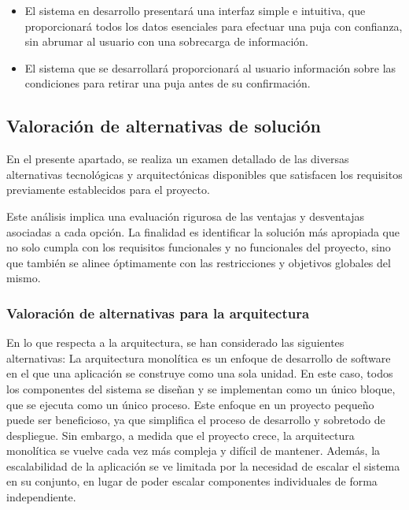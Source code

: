 \begin{itemize}
    \item El sistema en desarrollo presentará una interfaz simple e intuitiva, que proporcionará todos los datos esenciales para efectuar una puja con confianza, sin abrumar al usuario con una sobrecarga de información.
    \item El sistema que se desarrollará proporcionará al usuario información sobre las condiciones para retirar una puja antes de su confirmación.
\end{itemize}



\subsection{Valoración de alternativas de solución}
En el presente apartado, se realiza un examen detallado de las diversas alternativas tecnológicas y arquitectónicas disponibles que satisfacen los requisitos previamente establecidos para el proyecto. 

Este análisis implica una evaluación rigurosa de las ventajas y desventajas asociadas a cada opción. La finalidad es identificar la solución más apropiada que no solo cumpla con los requisitos funcionales y no funcionales del proyecto, sino que también se alinee óptimamente con las restricciones y objetivos globales del mismo.

\subsubsection{Valoración de alternativas para la arquitectura}
En lo que respecta a la arquitectura, se han considerado las siguientes alternativas:
La arquitectura monolítica es un enfoque de desarrollo de software en el que una aplicación se construye como una sola unidad. En este caso, todos los componentes del sistema se diseñan y se implementan como un único bloque, que se ejecuta como un único proceso.
Este enfoque en un proyecto pequeño puede ser beneficioso, ya que simplifica el proceso de desarrollo y sobretodo de despliegue. Sin embargo, a medida que el proyecto crece, la arquitectura monolítica se vuelve cada vez más compleja y difícil de mantener. Además, la escalabilidad de la aplicación se ve limitada por la necesidad de escalar el sistema en su conjunto, en lugar de poder escalar componentes individuales de forma independiente.


